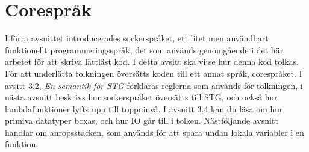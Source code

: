 \documentclass[Rapport]{subfiles}
\begin{document}
\section{Corespråk}


I förra avsnittet introducerades sockerspråket, ett litet men användbart
funktionellt programmeringsspråk, det som används genomgående i det här
arbetet för att skriva lättläst kod.
    I detta avsitt ska vi se hur denna kod tolkas. För att underlätta
tolkningen översätts koden till ett annat språk, corespråket. I avsitt
3.2, \emph{En semantik för STG} förklaras reglerna som används för
tolkningen, i nästa avsnitt beskrivs hur sockerspråket översätts
till STG, och också hur lambdafunktioner lyfts upp till toppninvå.
I avsnitt 3.4 kan du läsa om hur primiva datatyper boxas, och hur IO
går till i tolken. Nästföljande avsnitt handlar om anropsstacken, som
används för att spara undan lokala variabler i en funktion.












\end{document}
